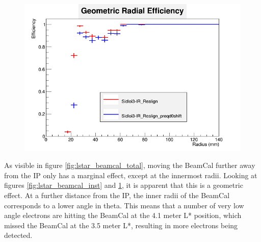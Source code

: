 \documentclass{report}
\begin{document}
                \begin{figure}[H]
                    \includegraphics[width=\textwidth]{RadialEfficiencyFP_geometric}
                    \centering
                    \caption{}
                    \label{fig:lstar_beamcal_geom}
                \end{figure}

                As visible in figure \ref{fig:lstar_beamcal_total}, moving the BeamCal further away from the IP only has a marginal effect, except at the innermost radii. Looking at figures \ref{fig:lstar_beamcal_inst} and \ref{fig:lstar_beamcal_geom}, it is apparent that this is a geometric effect. At a further distance from the IP, the inner radii of the BeamCal corresponds to a lower angle in theta. This means that a number of very low angle electrons are hitting the BeamCal at the 4.1 meter L* position, which missed the BeamCal at the 3.5 meter L*, resulting in more electrons being detected.
                
\end{document}
